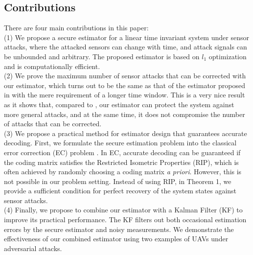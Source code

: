 \documentclass[twocolumn]{autart}    %
\newcommand{\rev}[1]{{\normalsize{{{\color{blue}#1}}}}}
\begin{document}
\subsection{Contributions}
\vspace{-0.4cm}
There are four main contributions in this paper:\\
(1) We propose a secure \rev{estimator} for a linear time invariant system under sensor attacks, where the attacked sensors can change with time, and attack signals can be unbounded and arbitrary.
The proposed \rev{estimator} is based on $l_1$ optimization and is computationally efficient.\\
(2) We prove the maximum number of sensor attacks that can be corrected with our \rev{estimator}, which turns out to be the same as that of the \rev{estimator} proposed in \cite{Fawzi2014} \rev{with \rev{the mere requirement of} a longer time window}. This is a very nice result as it shows that, compared to \cite{Fawzi2014}, our \rev{estimator} can protect the system against more general attacks, and at the same time, it does not compromise the number of attacks that can be corrected.\\
(3) We propose a practical method for \rev{estimator} design that guarantees accurate decoding. 
First, we formulate the secure estimation problem into the classical error correction (EC) problem \cite{Candes_Tao}. In EC, accurate decoding can be guaranteed if the coding matrix satisfies the Restricted Isometric Properties (RIP), {which is often achieved by randomly choosing a coding matrix \textit{a priori}. 
However, this is not possible in our problem setting. }
Instead of using RIP, in Theorem 1, we provide a sufficient condition for perfect recovery of the system states against sensor attacks.\\
(4) 
Finally, we propose to combine our \rev{estimator} with a Kalman Filter (KF) to improve its practical performance. 
The KF filters out both occasional estimation errors by the secure \rev{estimator} and noisy measurements.
We demonstrate the effectiveness of our combined estimator using two examples of UAVs under adversarial attacks.
\end{document}
